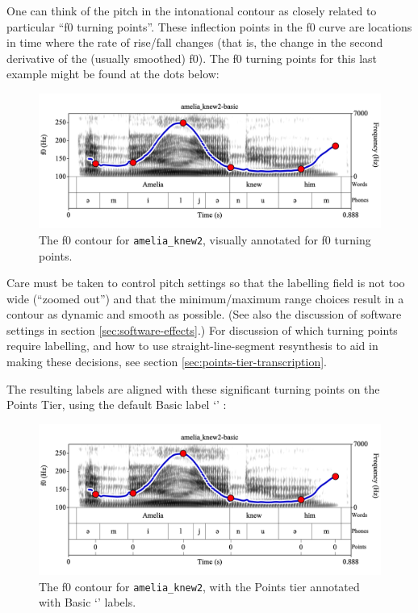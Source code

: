 \documentclass[11pt, twoside]{memoir}
\def\textlabel#1{{\relsize{-.5}\fontspec[Mapping=tex-text]{Roboto Mono}{#1}}}
\begin{document}
One can think of the pitch in the intonational contour as closely related to particular “f0 turning points”. These inflection points in the f0 curve are locations in time where the rate of rise\slash fall changes (that is, the change in the second derivative of the (usually smoothed) f0). The f0 turning points for this last example might be found at the dots below:
\begin{figure}[H]
\centering
\includegraphics[width=.875\linewidth]{Points-amelia_knew2-f0-dots.png}
\caption{The f0 contour for \texttt{amelia\_knew2}, visually annotated for f0 turning points.
\label{fig:amelia_knew2 f0 contour turning points}
}
\end{figure}
\begin{infobox}[frametitle=\textbf{PRACTICAL SUGGESTIONS}]
 Care must be taken to control pitch settings so that the labelling field is not too wide (“zoomed out”) and that the minimum\slash maximum range choices result in a contour as dynamic and smooth as possible. (See also the discussion of software settings in section \ref{sec:software-effects}.) For discussion of which turning points require labelling, and how to use straight-line-segment resynthesis to aid in making these decisions, see section \ref{sec:points-tier-transcription}.
\end{infobox}
The resulting labels are aligned with these significant turning points on the Points Tier, using the default Basic label ‘\textlabel{0}’ :
\begin{figure}[H]
\centering
\includegraphics[width=.875\linewidth]{Points-amelia_knew2-basic-dots.png}
\caption{The f0 contour for \texttt{amelia\_knew2}, with the Points tier annotated with Basic ‘\textlabel{0}’ labels.
\label{fig:amelia_knew2 f0 contour turning points 0 labels}
}
\end{figure}
\end{document}
